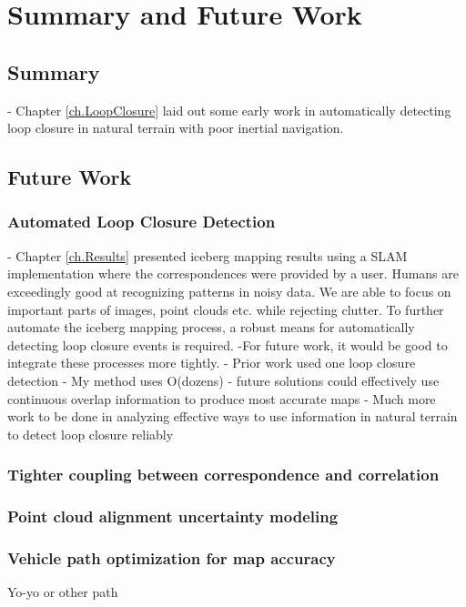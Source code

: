 
\chapter{Summary and Future Work}
\label{ch.FutureWork}

\section{Summary}
- Chapter \ref{ch.LoopClosure} laid out some early work in automatically detecting loop closure in natural terrain with poor inertial navigation. 

\section{Future Work}

\subsection{Automated Loop Closure Detection}
- Chapter \ref{ch.Results} presented iceberg mapping results using a SLAM implementation where the correspondences were provided by a user. Humans are exceedingly good at recognizing patterns in noisy data. We are able to focus on important parts of images, point clouds etc. while rejecting clutter. To further automate the iceberg mapping process, a robust means for automatically detecting loop closure events is required. 
-For future work, it would be good to integrate these processes more tightly.
	- Prior work used one loop closure detection
	- My method uses O(dozens)
	- future solutions could effectively use continuous overlap information to produce most accurate maps
- Much more work to be done in analyzing effective ways to use information in natural terrain to detect loop closure reliably

\subsection{Tighter coupling between correspondence and correlation}

\subsection{Point cloud alignment uncertainty modeling}

\subsection{Vehicle path optimization for map accuracy}
Yo-yo or other path 

